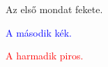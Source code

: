 \documentclass{article}
\begin{document}
\Huge Az első mondat fekete.

\textcolor{blue}{A második kék.}

\textcolor{red}{A harmadik piros.}
\end{document}
